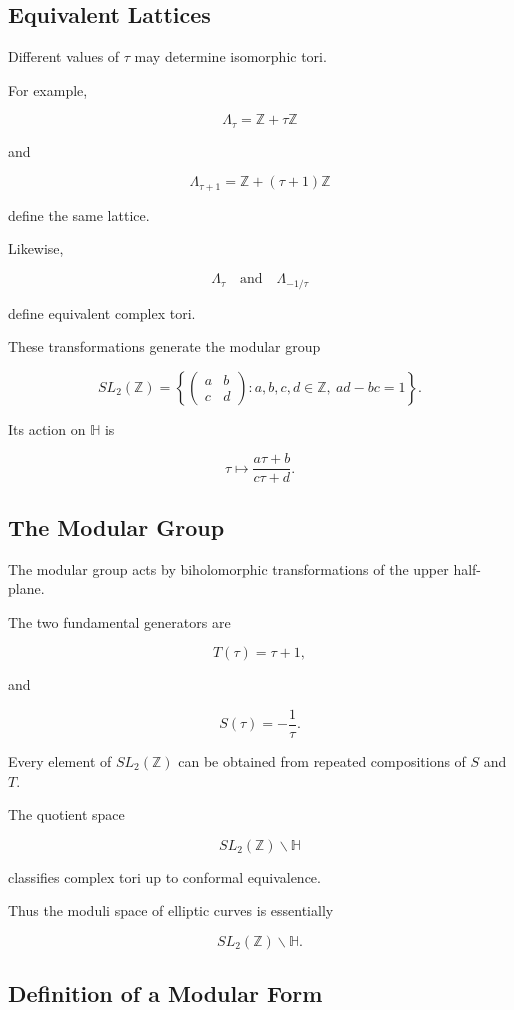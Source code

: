 \documentclass[12pt,a4paper]{article}
\theoremstyle{notespace}
\begin{document}
\subsection{Equivalent Lattices}

Different values of \(\tau\) may determine isomorphic tori.

For example,

\[
\Lambda_\tau
=
\mathbb Z+\tau\mathbb Z
\]

and

\[
\Lambda_{\tau+1}
=
\mathbb Z+(\tau+1)\mathbb Z
\]

define the same lattice.

Likewise,

\[
\Lambda_\tau
\quad\text{and}\quad
\Lambda_{-1/\tau}
\]

define equivalent complex tori.

These transformations generate the modular group

\[
SL_2(\mathbb Z)
=
\left\{
\begin{pmatrix}
	a&b\\
	c&d
\end{pmatrix}
:
a,b,c,d\in\mathbb Z,
\ ad-bc=1
\right\}.
\]

Its action on \(\mathbb H\) is

\[
\tau
\mapsto
\frac{a\tau+b}{c\tau+d}.
\]

\subsection{The Modular Group}

The modular group acts by biholomorphic transformations of the upper half-plane.

The two fundamental generators are

\[
T(\tau)=\tau+1,
\]

and

\[
S(\tau)=-\frac1\tau.
\]

Every element of \(SL_2(\mathbb Z)\) can be obtained from repeated compositions of \(S\) and \(T\).

The quotient space

\[
SL_2(\mathbb Z)\backslash\mathbb H
\]

classifies complex tori up to conformal equivalence.

Thus the moduli space of elliptic curves is essentially

\[
SL_2(\mathbb Z)\backslash\mathbb H.
\]

\subsection{Definition of a Modular Form}
\end{document}
